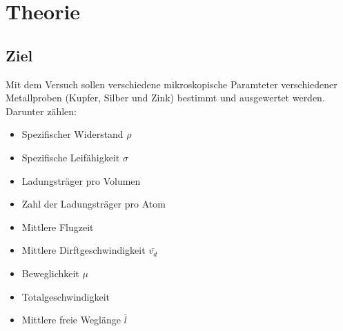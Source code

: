 \newpage
\section{Theorie}
\label{sec:theorie}


\subsection*{Ziel}
Mit dem Versuch sollen verschiedene mikroskopische Paramteter verschiedener Metallproben 
(Kupfer, Silber und Zink) bestimmt und ausgewertet werden.
Darunter zählen:\\
\begin{itemize}\itemsep0pt
    \item Spezifischer Widerstand $\rho$
    \item Spezifische Leifähigkeit $\sigma$
    \item Ladungsträger pro Volumen
    \item Zahl der Ladungsträger pro Atom
    \item Mittlere Flugzeit
    \item Mittlere Dirftgeschwindigkeit $\bar{v_d}$
    \item Beweglichkeit $\mu$
    \item Totalgeschwindigkeit
    \item Mittlere freie Weglänge $\bar{l}$
\end{itemize}
